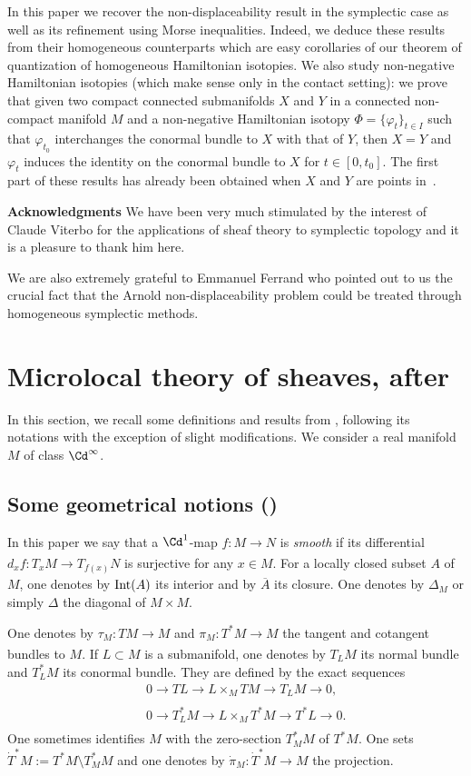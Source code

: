 \documentclass[12pt,leqno]{article}
\theoremstyle{definition}
\def\phi{{\varphi}}
\renewcommand{\to}[1][]{\xrightarrow[]{#1}}
\newcommand{\eqdot}{\mathbin{:=}}
\newcommand{\cl}{\colon}
\newcommand{\eqn}{\begin{eqnarray*}}
\newcommand{\eneqn}{\end{eqnarray*}}
\newcommand{\Int}{{\rm Int}}
\newcommand{\dT}{{\dot{T}}}
\newcommand{\dTM}{{\dT}^*M}
\numberwithin{equation}{section}
\begin{document}
In this paper we recover the non-displaceability result in the symplectic case
as well as its refinement using Morse inequalities. Indeed, we deduce these
results from their homogeneous counterparts which are easy corollaries of our
theorem of quantization of homogeneous Hamiltonian isotopies. We also study
non-negative Hamiltonian isotopies (which make sense only in the contact
setting): we prove that given two compact connected submanifolds $X$ and $Y$
in a connected non-compact manifold $M$ and a  non-negative Hamiltonian isotopy
$\Phi=\{\phi_t\}_{t\in I}$ such that $\phi_{t_0}$ interchanges the conormal bundle
to $X$ with that of $Y$, then $X=Y$ and $\phi_t$ induces the identity on the conormal bundle
to $X$ for $t\in[0,t_0]$. The first part of these results
has already been  obtained when $X$ and $Y$ are points in~\cite{CN10,CFP10}.



\medskip
\noindent
{\bf Acknowledgments}
We have been very much stimulated by the interest of 
Claude Viterbo for the applications of sheaf theory to symplectic topology
and it is a pleasure to thank him here.

We are also extremely grateful to Emmanuel Ferrand who pointed out to us the
crucial fact that  the Arnold 
non-displaceability problem could be treated
through homogeneous symplectic methods.

\section{Microlocal theory of sheaves, after~\cite{KS90}}
\label{section:mts}
In this section, we recall some definitions and results from
\cite{KS90}, following its notations with the exception of  slight
modifications. We consider a real manifold $M$ of class $\Cd^\infty$.


\subsection{Some geometrical notions (\cite[\S 4.2,~\S 6.2]{KS90})}
In this paper we say that a $\Cd^1$-map $f\cl M\to N$ is {\em smooth} if its
differential
$d_xf\cl T_xM\to T_{f(x)}N$ is surjective for any $x\in M$.
For a locally closed subset $A$ of $M$, one denotes by $\Int(A)$
its interior and by $\overline{A}$ its closure.
One denotes by $\Delta_M$ or simply $\Delta$ the diagonal of $M\times M$. 

One denotes by $\tau_M\cl TM\to M$ and 
$\pi_M\cl T^*M\to M$ the tangent and
cotangent bundles to $M$. If $L\subset M$ is a submanifold, one
denotes by $T_LM$ its normal bundle and $T^*_LM$ its conormal
bundle. They are defined by the exact sequences 
\eqn
&&0\to TL\to L\times_MTM\to T_LM\to0,\\
&&0\to T^*_LM\to L\times_MT^*M\to T^*L\to0.
\eneqn
One sometimes identifies $M$ with the zero-section $T^*_MM$ of
$T^*M$. 
One sets $\dTM\eqdot T^*M\setminus T^*_MM$ and one denotes by
$\dot\pi_M\cl\dTM\to M$ the projection.
\end{document}
